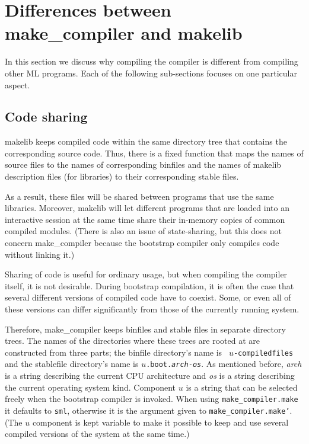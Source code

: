 
\section{Differences between make_compiler and makelib}

In this section we discuss why compiling the compiler is different
from compiling other ML programs.  Each of the following sub-sections
focuses on one particular aspect.

\subsection{Code sharing}

makelib keeps compiled code within the same directory tree that contains
the corresponding source code.  Thus, there is a fixed function
that maps the names of source files to the names of corresponding
binfiles and the names of makelib description files (for libraries) to
their corresponding stable files.

As a result, these files will be shared between programs that use the
same libraries.  Moreover, makelib will let different programs that are
loaded into an interactive session at the same time share their
in-memory copies of common compiled modules.  (There is also an issue of
state-sharing, but this does not concern make_compiler because the bootstrap
compiler only compiles code without linking it.)

Sharing of code is useful for ordinary usage, but when compiling the
compiler itself, it is not desirable.  During bootstrap compilation,
it is often the case that several different versions of compiled code
have to coexist.  Some, or even all of these versions can differ
significantly from those of the currently running system.

Therefore, make_compiler keeps binfiles and stable files in separate directory
trees.  The names of the directories where these trees are rooted at
are constructed from three parts; the binfile directory's name is {\tt
$u$-compiledfiles} and the stablefile directory's name is
{\tt $u$.boot.{\it arch}-{\it os}}.  As mentioned before, {\it arch}
is a string describing the current CPU architecture and {\it os} is a
string describing the current operating system kind. Component $u$ is
a string that can be selected freely when the bootstrap compiler is
invoked.  When using {\tt make_compiler.make} it defaults to {\tt sml},
otherwise it is the argument given to {\tt make_compiler.make'}.  (The $u$
component is kept variable to make it possible to keep and use several
compiled versions of the system at the same time.)

